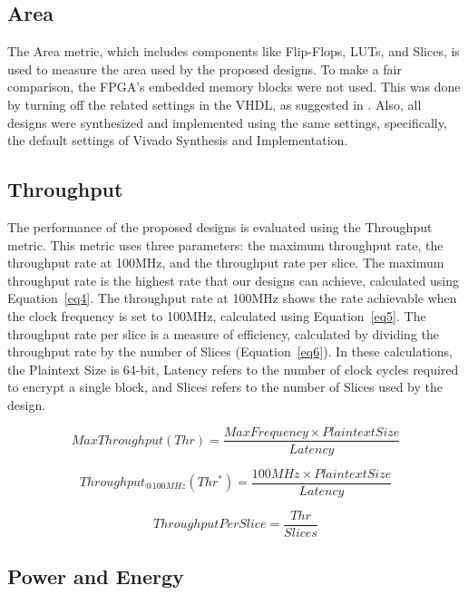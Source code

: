\documentclass[final,5p,times,twocolumn]{elsarticle}
\begin{document}
\subsection{Area}\label{subsec5}

The Area metric, which includes components like Flip-Flops, LUTs, and Slices, is used to measure the area used by the proposed designs. To make a fair comparison, the FPGA's embedded memory blocks were not used. This was done by turning off the related settings in the VHDL, as suggested in \cite{xilinx2022ultrafast}. Also, all designs were synthesized and implemented using the same settings, specifically, the default settings of Vivado Synthesis and Implementation.

\subsection{Throughput}\label{subsec6}
The performance of the proposed designs is evaluated using the Throughput metric. This metric uses three parameters: the maximum throughput rate, the throughput rate at 100MHz, and the throughput rate per slice.
The maximum throughput rate is the highest rate that our designs can achieve, calculated using Equation~\ref{eq4}.
The throughput rate at 100MHz shows the rate achievable when the clock frequency is set to 100MHz, calculated using Equation~\ref{eq5}.
The throughput rate per slice is a measure of efficiency, calculated by dividing the throughput rate by the number of Slices (Equation~\ref{eq6}).
In these calculations, the Plaintext Size is 64-bit, Latency refers to the number of clock cycles required to encrypt a single block, and Slices refers to the number of Slices used by the design.

\begin{equation}
    MaxThroughput(Thr) = \frac{MaxFrequency \times Plaintext Size}{Latency}
    \label{eq4}
\end{equation}

\begin{equation}
    Throughput_{@100MHz}(Thr^*) = \frac{100MHz \times Plaintext Size}{Latency}
    \label{eq5}
\end{equation}

\begin{equation}
    ThroughputPerSlice = \frac{Thr}{Slices}
    \label{eq6}
\end{equation}

\subsection{Power and Energy}\label{power_energy}
\end{document}
